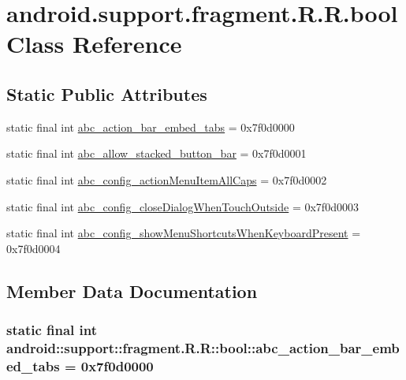 \hypertarget{classandroid_1_1support_1_1fragment_1_1_r_1_1bool}{
\section{android.support.fragment.R.R.bool Class Reference}
\label{classandroid_1_1support_1_1fragment_1_1_r_1_1bool}
}
\subsection*{Static Public Attributes}
\begin{CompactItemize}
\item 
static final int \hyperlink{classandroid_1_1support_1_1fragment_1_1_r_1_1bool_73c04a66b9ce60826571c275e78cea1e}{abc\_\-action\_\-bar\_\-embed\_\-tabs} = 0x7f0d0000
\item 
static final int \hyperlink{classandroid_1_1support_1_1fragment_1_1_r_1_1bool_4c9fa04da837df6568c5bcc25e1e49fd}{abc\_\-allow\_\-stacked\_\-button\_\-bar} = 0x7f0d0001
\item 
static final int \hyperlink{classandroid_1_1support_1_1fragment_1_1_r_1_1bool_450e130bcdef8ca21b30c4513413a3b7}{abc\_\-config\_\-actionMenuItemAllCaps} = 0x7f0d0002
\item 
static final int \hyperlink{classandroid_1_1support_1_1fragment_1_1_r_1_1bool_182eac1b18b1905786c86a064142ad3e}{abc\_\-config\_\-closeDialogWhenTouchOutside} = 0x7f0d0003
\item 
static final int \hyperlink{classandroid_1_1support_1_1fragment_1_1_r_1_1bool_09ff338b2b45baa2684ad6224df2544f}{abc\_\-config\_\-showMenuShortcutsWhenKeyboardPresent} = 0x7f0d0004
\end{CompactItemize}


\subsection{Member Data Documentation}
\hypertarget{classandroid_1_1support_1_1fragment_1_1_r_1_1bool_73c04a66b9ce60826571c275e78cea1e}{
\subsubsection[{abc\_\-action\_\-bar\_\-embed\_\-tabs}]{\setlength{\rightskip}{0pt plus 5cm}static final int android::support::fragment.R.R::bool::abc\_\-action\_\-bar\_\-embed\_\-tabs = 0x7f0d0000}}
\label{classandroid_1_1support_1_1fragment_1_1_r_1_1bool_73c04a66b9ce60826571c275e78cea1e}


